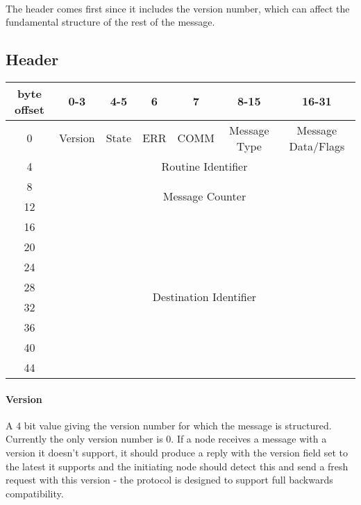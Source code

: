 \documentclass{article}
\begin{document}
\paragraph{}
The header comes first since it includes the version number, which can affect the fundamental structure of the rest of the message.

\subsection{Header}

\begin{tabular}{|c|c|c|c|c|c|c|}
  \hline
  byte offset & 0-3 & 4-5 & 6 & 7 & 8-15 & 16-31 \\ \hline
  0 & Version & State & ERR & COMM & Message Type & Message Data/Flags \\ \hline
  4 & \multicolumn{6}{|c|}{Routine Identifier} \\ \hline
  8 & \multicolumn{6}{|c|}{\multirow{2}{*}{Message Counter}} \\ \cline{1-1}
  12 & \multicolumn{6}{|c|}{} \\ \hline
  16 & \multicolumn{6}{|c|}{\multirow{8}{*}{Destination Identifier}} \\ \cline{1-1}
  20 & \multicolumn{6}{|c|}{} \\ \cline{1-1}
  24 & \multicolumn{6}{|c|}{} \\ \cline{1-1}
  28 & \multicolumn{6}{|c|}{} \\ \cline{1-1}
  32 & \multicolumn{6}{|c|}{} \\ \cline{1-1}
  36 & \multicolumn{6}{|c|}{} \\ \cline{1-1}
  40 & \multicolumn{6}{|c|}{} \\ \cline{1-1}
  44 & \multicolumn{6}{|c|}{} \\ \hline
\end{tabular}

\paragraph{Version}
A 4 bit value giving the version number for which the message is structured. Currently the only version number is 0. If a node receives a message with a version it doesn't support, it should produce a reply with the version field set to the latest it supports and the initiating node should detect this and send a fresh request with this version - the protocol is designed to support full backwards compatibility.
\end{document}
